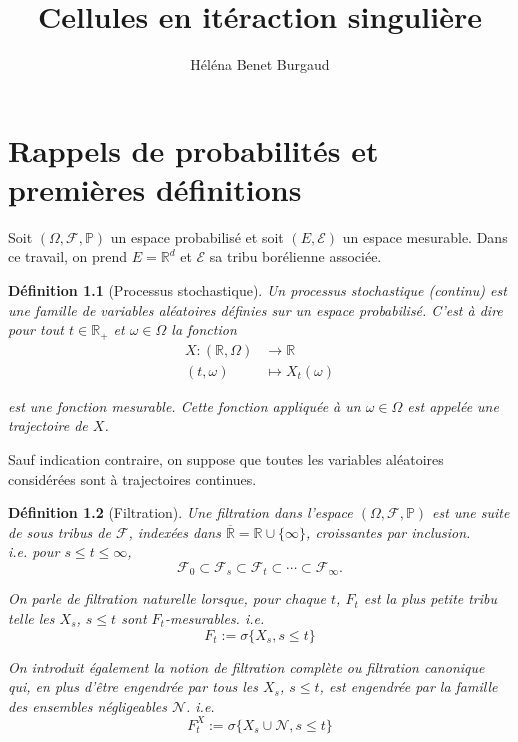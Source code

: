\documentclass[openany]{book}
\title{Cellules en itéraction singulière}
\author{Héléna Benet Burgaud}
\newcommand{\F}{\mathscr{F}}
\newcommand{\N}{\mathscr{N}}
\newcommand{\carE}{\mathscr{E}}
\renewcommand{\P}{\mathds{P}}
\newcommand{\R}{\mathbb{R}}
\newcommand{\1}{\mathbbm{1}}
\theoremstyle{thmfont}
\theoremstyle{deffont}
\newtheorem{definition}[definition]{Définition}
\theoremstyle{thmfont}
\theoremstyle{deffont}
\begin{document}

\maketitle
\tableofcontents
\clearpage
{} %
\setcounter{page}{1}
\let\cleardoublepage\relax
\chapter{Rappels de probabilités et premières définitions}

Soit $(\Omega, \F, \P )$ un espace probabilisé et soit $(E, \carE)$ un espace mesurable. Dans ce travail, on prend $E = \R^d$ et $\carE$ sa tribu borélienne associée.

\begin{definition}[Processus stochastique] Un \textit{processus stochastique (continu)} est une famille de variables aléatoires définies sur un espace probabilisé. C'est à dire pour tout $t \in \R_+$ et $\omega \in \Omega$ la fonction 
 \begin{align*}
   X : (\R, \Omega) &\rightarrow \R \\
   (t, \omega) &\mapsto X_t(\omega)
 \end{align*}
 
est une fonction mesurable. Cette fonction appliquée à un $\omega \in \Omega$ est appelée une \textit{trajectoire} de $X$.
\end{definition}

 Sauf indication contraire, on suppose que toutes les variables aléatoires considérées sont à trajectoires continues. 

\begin{definition}[Filtration] Une \textit{filtration} dans l'espace $(\Omega, \F, \P )$ est une suite de sous tribus de $\F$, indexées dans $\overline{\R} = \R \cup \{\infty\}$, croissantes par inclusion.\\
i.e. pour $s \leq t \leq \infty$,
$$\F_0 \subset \F_s \subset \F_t\subset \cdots \subset \F_\infty .$$

On parle de \textit{filtration naturelle} lorsque, pour chaque $t$, $F_t$ est la plus petite tribu telle les $X_s$, $s\leq t$ sont $F_t$-mesurables. i.e.
$$F_t := \sigma\{X_s, s\leq t\}$$

On introduit également la notion de \textit{filtration complète} ou
\textit{filtration canonique} qui, en plus d'être engendrée par tous les $X_s$, $s \leq t$, est engendrée par la famille des ensembles négligeables $\N$. i.e.
$$F^X_t := \sigma\{X_s\cup \N, s\leq t\}$$

\label{def:filtration}
\end{definition}
\end{document}
